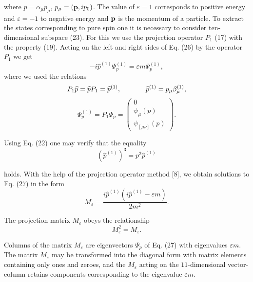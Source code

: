\documentclass[a4paper,12pt]{article}
\begin{document}
where $\widehat{p}=\alpha _\mu p_\mu $, $p_\mu =({\bf p},ip_0)$.
The value of $\varepsilon =1$ corresponds to positive energy and
$\varepsilon =-1$ to negative energy and ${\bf p}$ is the momentum
of a particle. To extract the states corresponding to pure spin
one it is necessary to consider ten-dimensional subspace (23). For
this we use the projection operator $P_1$ (17) with the property
(19). Acting on the left and right sides of Eq. (26) by the
operator $P_1$ we get
\begin{equation}
-i\widehat{p}^{(1)}\Psi^{(1)}_p=\varepsilon m\Psi^{(1)}_p,
\label{27}
\end{equation}
where we used the relations
\[
P_1 \widehat{p}=\widehat{p}P_1=\widehat{p}^{(1)},\hspace{0.5in}
\widehat{p}^{(1)}=p_\mu\beta_\mu^{(1)},
\]
\vspace{-8mm}
\begin{equation}
\label{28}
\end{equation}
\vspace{-8mm}
\[
 \Psi ^{(1)}_p=P_1\Psi_p=\left(
\begin{array}{c}
0\\
\psi_\mu (p)\\
\psi_{[\mu \nu ]}(p)
\end{array}
\right).
\]

Using Eq. (22) one may verify that the equality
\begin{equation}
\left(\widehat{p}^{(1)}\right)^3=p^2\widehat{p}^{(1)}  \label{29}
\end{equation}

holds. With the help of the projection operator method [8], we
obtain solutions to Eq. (27) in the form
\begin{equation}
M_{\varepsilon} =\frac{i\widehat{p}^{(1)}\left(
i\widehat{p}^{(1)}-\varepsilon m\right) }{ 2m^2}.  \label{30}
\end{equation}

The projection matrix $M_\varepsilon$ obeys the relationship
\begin{equation}
M_\varepsilon ^2=M_\varepsilon.  \label{31}
\end{equation}

Columns of the matrix $M_\varepsilon $ are eigenvectors $\Psi _p$
of Eq. (27) with eigenvalues $ \varepsilon m$. The matrix $
M_\varepsilon $ may be transformed into the diagonal form with
matrix elements containing only ones and zeroes, and the
$M_\varepsilon $ acting on the $11$-dimensional vector-column
retains components corresponding to the eigenvalue $ \varepsilon
m$.
\end{document}
